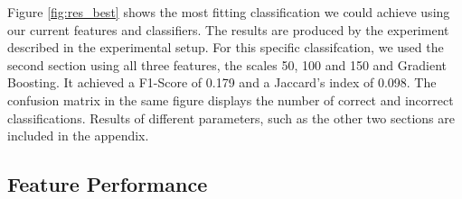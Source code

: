 Figure \ref{fig:res_best} shows the most fitting classification we could achieve using our current features and classifiers. The results are produced by the experiment described in the experimental setup. For this specific classifcation, we used the second section using all three features, the scales 50, 100 and 150 and Gradient Boosting. It achieved a F1-Score of 0.179 and a Jaccard's index of 0.098. The confusion matrix in the same figure displays the number of correct and incorrect classifications. Results of different parameters, such as the other two sections are included in the appendix.

\subsection{Feature Performance}


\datazero

